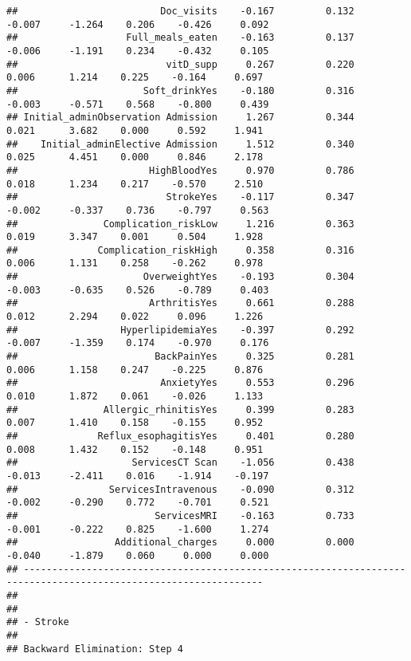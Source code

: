 \documentclass[
]{article}
\begin{document}
\begin{verbatim}
##                         Doc_visits    -0.167         0.132       -0.007     -1.264    0.206    -0.426     0.092 
##                   Full_meals_eaten    -0.163         0.137       -0.006     -1.191    0.234    -0.432     0.105 
##                          vitD_supp     0.267         0.220        0.006      1.214    0.225    -0.164     0.697 
##                      Soft_drinkYes    -0.180         0.316       -0.003     -0.571    0.568    -0.800     0.439 
## Initial_adminObservation Admission     1.267         0.344        0.021      3.682    0.000     0.592     1.941 
##    Initial_adminElective Admission     1.512         0.340        0.025      4.451    0.000     0.846     2.178 
##                       HighBloodYes     0.970         0.786        0.018      1.234    0.217    -0.570     2.510 
##                          StrokeYes    -0.117         0.347       -0.002     -0.337    0.736    -0.797     0.563 
##               Complication_riskLow     1.216         0.363        0.019      3.347    0.001     0.504     1.928 
##              Complication_riskHigh     0.358         0.316        0.006      1.131    0.258    -0.262     0.978 
##                      OverweightYes    -0.193         0.304       -0.003     -0.635    0.526    -0.789     0.403 
##                       ArthritisYes     0.661         0.288        0.012      2.294    0.022     0.096     1.226 
##                  HyperlipidemiaYes    -0.397         0.292       -0.007     -1.359    0.174    -0.970     0.176 
##                        BackPainYes     0.325         0.281        0.006      1.158    0.247    -0.225     0.876 
##                         AnxietyYes     0.553         0.296        0.010      1.872    0.061    -0.026     1.133 
##               Allergic_rhinitisYes     0.399         0.283        0.007      1.410    0.158    -0.155     0.952 
##              Reflux_esophagitisYes     0.401         0.280        0.008      1.432    0.152    -0.148     0.951 
##                    ServicesCT Scan    -1.056         0.438       -0.013     -2.411    0.016    -1.914    -0.197 
##                ServicesIntravenous    -0.090         0.312       -0.002     -0.290    0.772    -0.701     0.521 
##                        ServicesMRI    -0.163         0.733       -0.001     -0.222    0.825    -1.600     1.274 
##                 Additional_charges     0.000         0.000       -0.040     -1.879    0.060     0.000     0.000 
## ----------------------------------------------------------------------------------------------------------------
## 
## 
## - Stroke 
## 
## Backward Elimination: Step 4 

\end{verbatim}
\end{document}
